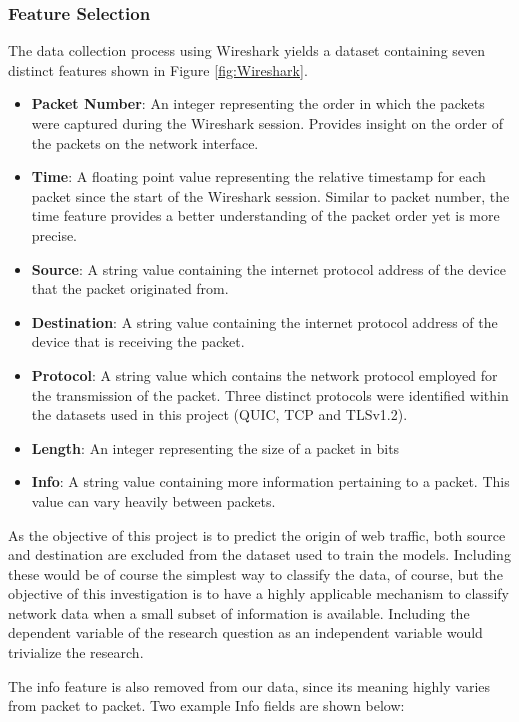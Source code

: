 \documentclass[10pt,sigconf,letterpaper,nonacm]{acmart}
\begin{document}
\subsubsection{Feature Selection}
The data collection process using Wireshark yields a dataset containing seven distinct features shown in Figure \ref{fig:Wireshark}. 
\begin{itemize}
  \item \textbf{Packet Number}: An integer representing the order in which the packets were captured during the Wireshark session. Provides insight on the order of the packets on the network interface. 
  \item \textbf{Time}: A floating point value representing the relative timestamp for each packet since the start of the Wireshark session. Similar to packet number, the time feature provides a better understanding of the packet order yet is more precise.
  \item \textbf{Source}: A string value containing the internet protocol address of the device that the packet originated from. 
  \item \textbf{Destination}: A string value containing the internet protocol address of the device that is receiving the packet. 
  \item \textbf{Protocol}: A string value which contains the network protocol employed for the transmission of the packet. Three distinct protocols were identified within the datasets used in this project (QUIC, TCP and TLSv1.2).
  \item \textbf{Length}: An integer representing the size of a packet in bits 
  \item \textbf{Info}: A string value containing more information pertaining to a packet. This value can vary heavily between packets.
\end{itemize} 
As the objective of this project is to predict the origin of web traffic, both source and destination are excluded from the dataset used to train the models. 
Including these would be of course the simplest way to classify the data, of course, but the objective of this investigation is to have a highly applicable mechanism to classify network data when a small subset of information is available. 
Including the dependent variable of the research question as an independent variable would trivialize the research.

The info feature is also removed from our data, since its meaning highly varies from packet to packet. Two example Info fields are shown below:
\end{document}
